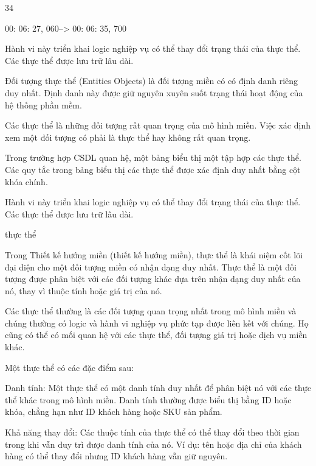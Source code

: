 34

00: 06: 27, 060--> 00: 06: 35, 700

Hành vi này triển khai logic nghiệp vụ có thể thay đổi trạng thái của thực thể. Các thực thể được lưu trữ lâu dài.


Đối tượng thực thể (Entities Objects) là đối tượng miền có có định danh riêng duy nhất. Định danh này được giữ nguyên xuyên suốt trạng thái hoạt động của hệ thống phần mềm.

Các thực thể là những đối tượng rất quan trọng của mô hình miền. Việc xác định xem một đối tượng có phải là thực thể hay không rất quan trọng.

Trong trường hợp CSDL quan hệ, một bảng biểu thị một tập hợp các thực thể. Các quy tắc trong bảng biểu thị các thực thể được xác định duy nhất bằng cột khóa chính.

Hành vi này triển khai logic nghiệp vụ có thể thay đổi trạng thái của thực thể. Các thực thể được lưu trữ lâu dài.





thực thể

Trong Thiết kế hướng miền (thiết kế hướng miền), thực thể là khái niệm cốt lõi đại diện cho một đối tượng miền có nhận dạng duy nhất. Thực thể là một đối tượng được phân biệt với các đối tượng khác dựa trên nhận dạng duy nhất của nó, thay vì thuộc tính hoặc giá trị của nó.

Các thực thể thường là các đối tượng quan trọng nhất trong mô hình miền và chúng thường có logic và hành vi nghiệp vụ phức tạp được liên kết với chúng. Họ cũng có thể có mối quan hệ với các thực thể, đối tượng giá trị hoặc dịch vụ miền khác.

Một thực thể có các đặc điểm sau:

Danh tính: Một thực thể có một danh tính duy nhất để phân biệt nó với các thực thể khác trong mô hình miền. Danh tính thường được biểu thị bằng ID hoặc khóa, chẳng hạn như ID khách hàng hoặc SKU sản phẩm.

Khả năng thay đổi: Các thuộc tính của thực thể có thể thay đổi theo thời gian trong khi vẫn duy trì được danh tính của nó. Ví dụ: tên hoặc địa chỉ của khách hàng có thể thay đổi nhưng ID khách hàng vẫn giữ nguyên.

